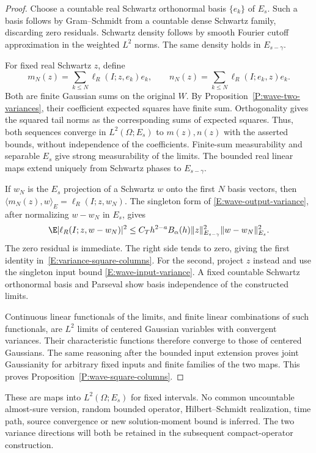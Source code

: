 \begin{proof}
  Choose a countable real Schwartz orthonormal basis $\{e_k\}$ of $E_s$.
  Such a basis follows by Gram--Schmidt from a countable dense Schwartz
  family, discarding zero residuals. Schwartz density follows by smooth
  Fourier cutoff approximation in the weighted $L^2$ norms. The same
  density holds in $E_{s-\gamma}$.

  For fixed real Schwartz $z$, define
  \[
    m_N(z) = \sum_{k\le N}\ell_R(I;z,e_k)e_k,
    \qquad n_N(z) = \sum_{k\le N}\ell_R(I;e_k,z)e_k.
  \]
  Both are finite Gaussian sums on the original $W$. By
  Proposition~\ref{P:wave-two-variances}, their coefficient expected squares
  have finite sum. Orthogonality gives the squared tail norms as the
  corresponding sums of expected squares. Thus, both sequences converge
  in $L^2(\Omega;E_s)$ to $m(z),n(z)$ with the asserted bounds, without
  independence of the coefficients. Finite-sum measurability and separable
  $E_s$ give strong measurability of the limits. The bounded real linear
  maps extend uniquely from Schwartz phases to $E_{s-\gamma}$.

  If $w_N$ is the $E_s$ projection of a Schwartz $w$ onto the first $N$
  basis vectors, then
  $\langle m_N(z),w\rangle_E = \ell_R(I;z,w_N)$. The singleton form of
  \eqref{E:wave-output-variance}, after normalizing $w-w_N$ in $E_s$,
  gives
  \[
    \E|\ell_R(I;z,w-w_N)|^2
    \le C_T h^{2-a}B_\alpha(h)\|z\|_{E_{s-\gamma}}^2\|w-w_N\|_{E_s}^2.
  \]
  The zero residual is immediate. The right side tends to zero, giving
  the first identity in~\eqref{E:variance-square-columns}. For the second,
  project $z$ instead and use the singleton input bound
  \eqref{E:wave-input-variance}. A fixed countable Schwartz orthonormal
  basis and Parseval show basis independence of the constructed limits.

  Continuous linear functionals of the limits, and finite linear
  combinations of such functionals, are $L^2$ limits of centered Gaussian
  variables with convergent variances. Their characteristic functions
  therefore converge to those of centered Gaussians. The same reasoning
  after the bounded input extension proves joint Gaussianity for arbitrary
  fixed inputs and finite families of the two maps.
  This proves Proposition~\ref{P:wave-square-columns}.
\end{proof}

These are maps into $L^2(\Omega;E_s)$ for fixed intervals. No common
uncountable almost-sure version, random bounded operator, Hilbert--Schmidt
realization, time path, source convergence or new solution-moment bound
is inferred. The two variance directions will both be retained in the
subsequent compact-operator construction.
